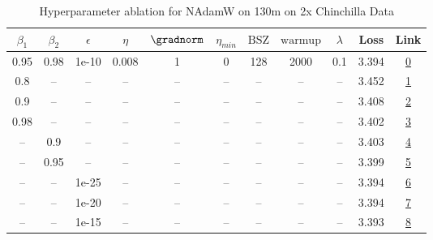 \begin{table}[H]
\centering
\caption{Hyperparameter ablation for NAdamW on 130m on 2x Chinchilla Data}
\label{tab:ablation_nadamw_130m_on_2x_chinchilla_data}
\begin{tabular}{ccccccccccc}
\toprule
$\beta_1$ & $\beta_2$ & $\epsilon$ & $\eta$ & $\gradnorm$ & $\eta_{min}$ & $\mathrm{BSZ}$ & $\mathrm{warmup}$ & $\lambda$ & Loss & Link \\
\midrule
0.95 & 0.98 & 1e-10 & 0.008 & 1 & 0 & 128 & 2000 & 0.1 & 3.394 & \href{https://wandb.ai/stanford-mercury/optimizer-scaling/runs/sweep-130m-5B-nadamw1c5657lr0.008-wd0.1-minlr0-warmup2000-b10.95-2e57b5}{0} \\
\midrule
0.8 & -- & -- & -- & -- & -- & -- & -- & -- & 3.452 & \href{https://wandb.ai/stanford-mercury/optimizer-scaling/runs/sweep-130m-5B-nadamw145e13lr0.008-wd0.1-minlr0-warmup2000-b10.8--6616c2}{1} \\
0.9 & -- & -- & -- & -- & -- & -- & -- & -- & 3.408 & \href{https://wandb.ai/stanford-mercury/optimizer-scaling/runs/sweep-130m-5B-nadamwc38fe0lr0.008-wd0.1-minlr0-warmup2000-b10.9--6a46e9}{2} \\
0.98 & -- & -- & -- & -- & -- & -- & -- & -- & 3.402 & \href{https://wandb.ai/stanford-mercury/optimizer-scaling/runs/sweep-130m-5B-nadamw32e168lr0.008-wd0.1-minlr0-warmup2000-b10.98-4a84a1}{3} \\
-- & 0.9 & -- & -- & -- & -- & -- & -- & -- & 3.403 & \href{https://wandb.ai/stanford-mercury/optimizer-scaling/runs/sweep-130m-5B-nadamw5addd4lr0.008-wd0.1-minlr0-warmup2000-b10.95-29b3aa}{4} \\
-- & 0.95 & -- & -- & -- & -- & -- & -- & -- & 3.399 & \href{https://wandb.ai/stanford-mercury/optimizer-scaling/runs/sweep-130m-5B-nadamwdd3b0blr0.008-wd0.1-minlr0-warmup2000-b10.95-20518c}{5} \\
-- & -- & 1e-25 & -- & -- & -- & -- & -- & -- & 3.394 & \href{https://wandb.ai/stanford-mercury/optimizer-scaling/runs/sweep-130m-5B-nadamwca7dc8lr0.008-wd0.1-minlr0-warmup2000-b10.95-6aab84}{6} \\
-- & -- & 1e-20 & -- & -- & -- & -- & -- & -- & 3.394 & \href{https://wandb.ai/stanford-mercury/optimizer-scaling/runs/sweep-130m-5B-nadamwf3a9adlr0.008-wd0.1-minlr0-warmup2000-b10.95-ab0d37}{7} \\
-- & -- & 1e-15 & -- & -- & -- & -- & -- & -- & 3.393 & \href{https://wandb.ai/stanford-mercury/optimizer-scaling/runs/sweep-130m-5B-nadamw153a2alr0.008-wd0.1-minlr0-warmup2000-b10.95-d349f4}{8} \\

\end{tabular}
\end{table}
